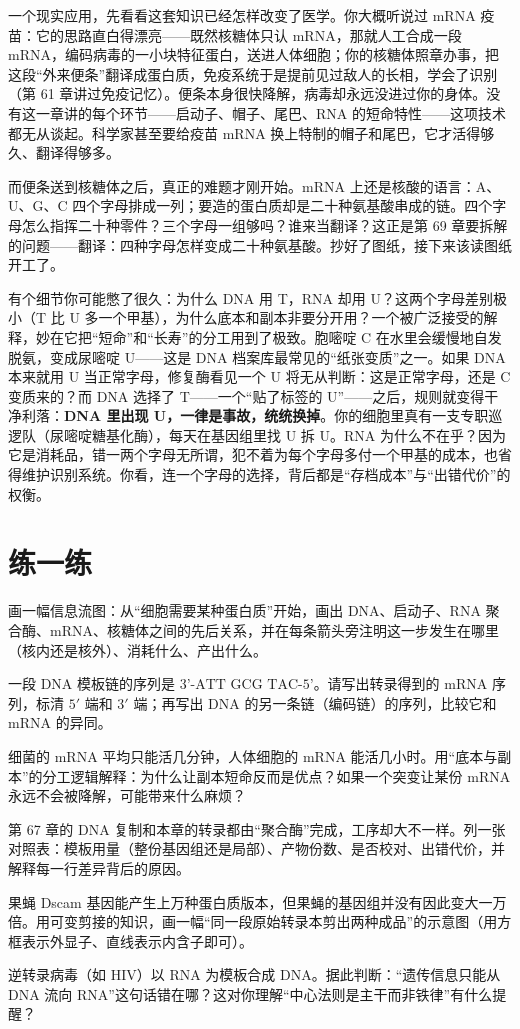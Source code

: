 一个现实应用，先看看这套知识已经怎样改变了医学。你大概听说过 mRNA 疫苗：它的思路直白得漂亮——既然核糖体只认 mRNA，那就人工合成一段 mRNA，编码病毒的一小块特征蛋白，送进人体细胞；你的核糖体照章办事，把这段“外来便条”翻译成蛋白质，免疫系统于是提前见过敌人的长相，学会了识别（第 61 章讲过免疫记忆）。便条本身很快降解，病毒却永远没进过你的身体。没有这一章讲的每个环节——启动子、帽子、尾巴、RNA 的短命特性——这项技术都无从谈起。科学家甚至要给疫苗 mRNA 换上特制的帽子和尾巴，它才活得够久、翻译得够多。

而便条送到核糖体之后，真正的难题才刚开始。mRNA 上还是核酸的语言：A、U、G、C 四个字母排成一列；要造的蛋白质却是二十种氨基酸串成的链。四个字母怎么指挥二十种零件？三个字母一组够吗？谁来当翻译？这正是第 69 章要拆解的问题——翻译：四种字母怎样变成二十种氨基酸。抄好了图纸，接下来该读图纸开工了。

\begin{tiaozhan}
有个细节你可能憋了很久：为什么 DNA 用 T，RNA 却用 U？这两个字母差别极小（T 比 U 多一个甲基），为什么底本和副本非要分开用？一个被广泛接受的解释，妙在它把“短命”和“长寿”的分工用到了极致。胞嘧啶 C 在水里会缓慢地自发脱氨，变成尿嘧啶 U——这是 DNA 档案库最常见的“纸张变质”之一。如果 DNA 本来就用 U 当正常字母，修复酶看见一个 U 将无从判断：这是正常字母，还是 C 变质来的？而 DNA 选择了 T——一个“贴了标签的 U”——之后，规则就变得干净利落：\textbf{DNA 里出现 U，一律是事故，统统换掉}。你的细胞里真有一支专职巡逻队（尿嘧啶糖基化酶），每天在基因组里找 U 拆 U。RNA 为什么不在乎？因为它是消耗品，错一两个字母无所谓，犯不着为每个字母多付一个甲基的成本，也省得维护识别系统。你看，连一个字母的选择，背后都是“存档成本”与“出错代价”的权衡。
\end{tiaozhan}

\section*{练一练}

\begin{sikaoti}
\item 画一幅信息流图：从“细胞需要某种蛋白质”开始，画出 DNA、启动子、RNA 聚合酶、mRNA、核糖体之间的先后关系，并在每条箭头旁注明这一步发生在哪里（核内还是核外）、消耗什么、产出什么。
\item 一段 DNA 模板链的序列是 $\text{3'-ATT GCG TAC-5'}$。请写出转录得到的 mRNA 序列，标清 $5'$ 端和 $3'$ 端；再写出 DNA 的另一条链（编码链）的序列，比较它和 mRNA 的异同。
\item 细菌的 mRNA 平均只能活几分钟，人体细胞的 mRNA 能活几小时。用“底本与副本”的分工逻辑解释：为什么让副本短命反而是优点？如果一个突变让某份 mRNA 永远不会被降解，可能带来什么麻烦？
\item 第 67 章的 DNA 复制和本章的转录都由“聚合酶”完成，工序却大不一样。列一张对照表：模板用量（整份基因组还是局部）、产物份数、是否校对、出错代价，并解释每一行差异背后的原因。
\item 果蝇 Dscam 基因能产生上万种蛋白质版本，但果蝇的基因组并没有因此变大一万倍。用可变剪接的知识，画一幅“同一段原始转录本剪出两种成品”的示意图（用方框表示外显子、直线表示内含子即可）。
\item 逆转录病毒（如 HIV）以 RNA 为模板合成 DNA。据此判断：“遗传信息只能从 DNA 流向 RNA”这句话错在哪？这对你理解“中心法则是主干而非铁律”有什么提醒？
\end{sikaoti}

